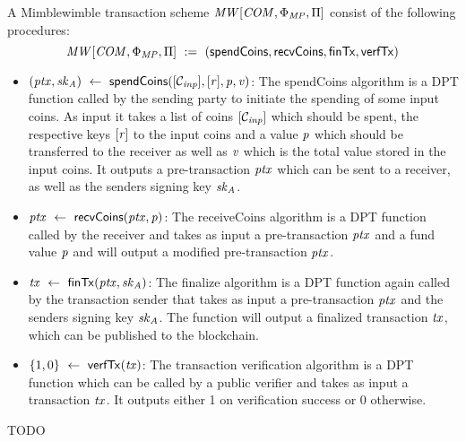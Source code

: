 \begin{definition}
    \label{def:mw-tx-scheme}
    A Mimblewimble transaction scheme $\mathit{MW}[\mathit{COM},\Phi_{\mathit{MP}},\Pi]$ consist of the following procedures:
    \[ \mathit{MW}[\mathit{COM},\Phi_{\mathit{MP}},\Pi] ~:=~ ( \mathsf{spendCoins},\mathsf{recvCoins},\mathsf{finTx},\mathsf{verfTx} ) \]
    \begin{itemize}
        \item $(\mathit{ptx}, \mathit{sk}_{\mathit{A}}) ~\leftarrow~ \mathsf{spendCoins}([\mathcal{C}_{\mathit{inp}}],[\mathit{r}],\mathit{p},\mathit{v})$: The spendCoins algorithm is a DPT function called by the sending party to
        initiate the spending of some input coins. As input it takes a list of coins $[\mathcal{C}_{\mathit{inp}}]$ which should be spent, the respective keys $[\mathit{r}]$ to the input coins and a value $\mathit{p}$ which should be
        transferred to the receiver as well as $\mathit{v}$ which is the total value stored in the input coins. It outputs a pre-transaction $\mathit{ptx}$ which can be sent to a receiver, as well as the senders signing key $\mathit{sk}_{\mathit{A}}$.
        \item $\mathit{ptx} ~\leftarrow~ \mathsf{recvCoins}(\mathit{ptx},\mathit{p})$: The receiveCoins algorithm is a DPT function called by the receiver and takes as input a pre-transaction $\mathit{ptx}$ and a fund value
        $\mathit{p}$ and will output a modified pre-transaction $\mathit{ptx}$.
        \item $\mathit{tx} ~\leftarrow~ \mathsf{finTx}(\mathit{ptx},\mathit{sk}_{\mathit{A}})$: The finalize algorithm is a DPT function again called by the transaction sender that takes as input a pre-transaction $\mathit{ptx}$ and the senders
        signing key $\mathit{sk}_{\mathit{A}}$. The function will output a finalized transaction $\mathit{tx}$, which can be published to the blockchain.
        \item $\{1,0\} ~\leftarrow~ \mathsf{verfTx}(\mathit{tx})$: The transaction verification algorithm is a DPT function which can be called by a public verifier and takes as input a transaction $\mathit{tx}$. It
        outputs either 1 on verification success or 0 otherwise.
    \end{itemize}
\end{definition}

\begin{definition}
    \label{def:ext-mw-tx-scheme}
    TODO
\end{definition}

